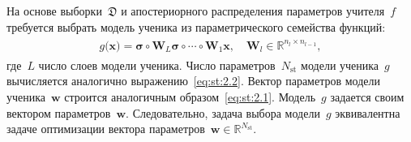 \documentclass[12pt]{a&t}
\begin{document}
На основе выборки~$\mathfrak{D}$ и апостериорного распределения параметров учителя~$f$ требуется выбрать модель ученика из параметрического семейства функций:
\begin{gather}
\label{eq:st:5}
\begin{aligned}
g\bigr(\mathbf{x}\bigr) = \bm{\sigma} \circ \mathbf{W}_L\bm{\sigma}  \circ \cdots \circ \mathbf{W}_1\mathbf{x}, \quad \mathbf{W}_l \in \mathbb{R}^{n_l \times n_{l-1}},
\end{aligned}
\end{gather}
где~$L$ число слоев модели ученика.
Число параметров~$N_{\text{st}}$ модели ученика~$g$ вычисляется аналогично выражению~\eqref{eq:st:2.2}.
Вектор параметров модели ученика~$\mathbf{w}$ строится аналогичным образом~\eqref{eq:st:2.1}.
Модель~$g$ задается своим вектором параметров~$\mathbf{w}$.
Следовательно, задача выбора модели~$g$ эквивалентна задаче оптимизации вектора параметров~$\mathbf{w}\in\mathbb{R}^{N_{\text{st}}}$.
\end{document}
